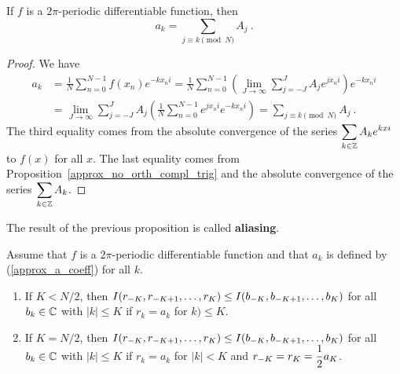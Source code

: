 \begin{prop}
If $f$ is a $2\pi$-periodic differentiable function, then
\[
a_k = \sum_{j\equiv k\pmod{N}} A_j  \ .
\]
\end{prop}

\begin{proof}
We have
\begin{align*}
a_k &= \frac{1}{N} \sum_{n=0}^{N-1} f(x_n) e^{-k x_n i}
= \frac{1}{N} \sum_{n=0}^{N-1} \left(
\lim_{J\rightarrow \infty} \sum_{j=-J}^J A_j e^{j x_n i}\right) e^{-k x_n i} \\
&= \lim_{J\rightarrow \infty} \sum_{j=-J}^J A_j \left(
\frac{1}{N} \sum_{n=0}^{N-1} e^{j x_n i} e^{-k x_n i} \right)
= \sum_{j\equiv k \pmod{N}} A_j \ .
\end{align*}
The third equality comes from the absolute convergence of the series
$\displaystyle \sum_{k\in \mathbb{Z}} A_k e^{k x i}$ to $f(x)$ for all $x$.
The last equality comes from
Proposition~\ref{approx_no_orth_compl_trig} and the absolute
convergence of the series $\displaystyle \sum_{k\in \mathbb{Z}} A_k$.
\end{proof}

The result of the previous proposition is called
{\bfseries aliasing}.

\begin{theorem}
Assume that $f$ is a $2\pi$-periodic differentiable function and that
$a_k$ is defined by (\ref{approx_a_coeff}) for all $k$.
\begin{enumerate}
\item If $K<N/2$, then
$\displaystyle I(r_{-K},r_{-K+1}, \ldots, r_K)
\leq I(b_{-K},b_{-K+1}, \ldots, b_K)$ for all $b_k \in \mathbb{C}$ with
$|k|\leq K$ if $r_k =a_k$ for $k)\leq K$.
\item If $K=N/2$, then
$\displaystyle I(r_{-K},r_{-K+1}, \ldots, r_K)
\leq I(b_{-K},b_{-K+1}, \ldots, b_K)$ for all $b_k \in \mathbb{C}$ with
$|k|\leq K$ if $r_k = a_k$ for $|k|<K$ and
$\displaystyle r_{-K}=r_K = \frac{1}{2} a_K$.
\end{enumerate}
\label{approx_coeffs_comple_trig}
\end{theorem}

